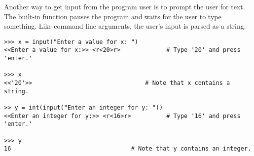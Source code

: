 Another way to get input from the program user is to prompt the user for text.
The built-in function  pauses the program and waits for the user to type something.
Like command line arguments, the user's input is parsed as a string.

\begin{lstlisting}
>>> x = input("Enter a value for x: ")
<<Enter a value for x:>> <r<20>r>             # Type '20' and press 'enter.'

>>> x
<<'20'>>                                # Note that x contains a string.

>> y = int(input("Enter an integer for y: "))
<<Enter an integer for y:>> <r<16>r>          # Type '16' and press 'enter.'

>>> y
16                                  # Note that y contains an integer.
\end{lstlisting}


